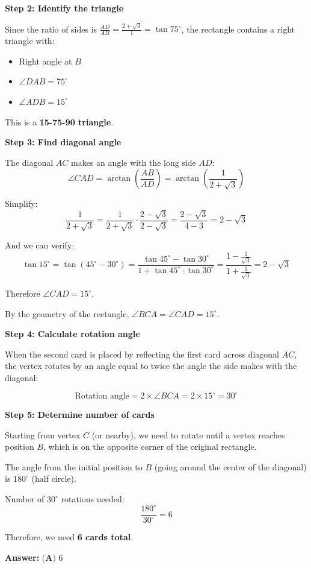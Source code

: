 \documentclass[12pt]{article}
\begin{document}
\textbf{Step 2: Identify the triangle}

Since the ratio of sides is $\frac{AD}{AB} = \frac{2+\sqrt{3}}{1} = \tan 75^\circ$, the rectangle contains a right triangle with:
\begin{itemize}
    \item Right angle at $B$
    \item $\angle DAB = 75^\circ$
    \item $\angle ADB = 15^\circ$
\end{itemize}

This is a \textbf{15-75-90 triangle}.

\textbf{Step 3: Find diagonal angle}

The diagonal $AC$ makes an angle with the long side $AD$:
\[\angle CAD = \arctan\left(\frac{AB}{AD}\right) = \arctan\left(\frac{1}{2+\sqrt{3}}\right)\]

Simplify:
\[\frac{1}{2+\sqrt{3}} = \frac{1}{2+\sqrt{3}} \cdot \frac{2-\sqrt{3}}{2-\sqrt{3}} = \frac{2-\sqrt{3}}{4-3} = 2-\sqrt{3}\]

And we can verify:
\[\tan 15^\circ = \tan(45^\circ - 30^\circ) = \frac{\tan 45^\circ - \tan 30^\circ}{1 + \tan 45^\circ \cdot \tan 30^\circ} = \frac{1 - \frac{1}{\sqrt{3}}}{1 + \frac{1}{\sqrt{3}}} = 2 - \sqrt{3}\]

Therefore $\angle CAD = 15^\circ$.

By the geometry of the rectangle, $\angle BCA = \angle CAD = 15^\circ$.

\textbf{Step 4: Calculate rotation angle}

When the second card is placed by reflecting the first card across diagonal $AC$, the vertex rotates by an angle equal to twice the angle the side makes with the diagonal:

\[\text{Rotation angle} = 2 \times \angle BCA = 2 \times 15^\circ = 30^\circ\]

\textbf{Step 5: Determine number of cards}

Starting from vertex $C$ (or nearby), we need to rotate until a vertex reaches position $B$, which is on the opposite corner of the original rectangle.

The angle from the initial position to $B$ (going around the center of the diagonal) is $180^\circ$ (half circle).

Number of $30^\circ$ rotations needed:
\[\frac{180^\circ}{30^\circ} = 6\]

Therefore, we need \textbf{6 cards total}.

\textbf{Answer: } $\boxed{\textbf{(A) } 6}$
\end{document}
